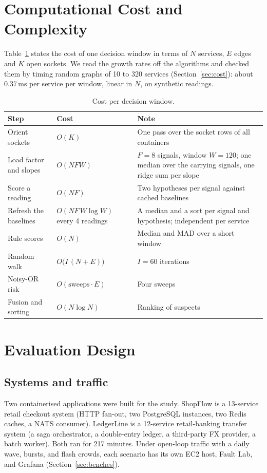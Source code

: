 \section{Computational Cost and Complexity}
\label{sec:complexity}
Table~\ref{tab:complexity} states the cost of one decision window in terms of $N$ services, $E$ edges and $K$ open sockets. We read the growth rates off the algorithms and checked them by timing random graphs of 10 to 320 services (Section~\ref{sec:cost}): about $0.37$\,ms per service per window, linear in $N$, on synthetic readings.

\begin{table}[!htbp]
\centering
\caption{Cost per decision window.}
\label{tab:complexity}
\small
\renewcommand{\arraystretch}{1.2}
\begin{tabularx}{\textwidth}{>{\raggedright\arraybackslash}p{4.2cm}>{\raggedright\arraybackslash}p{4.0cm}>{\raggedright\arraybackslash}X}
\toprule
\textbf{Step} & \textbf{Cost} & \textbf{Note}\\
\midrule
Orient sockets & $O(K)$ & One pass over the socket rows of all containers\\
Load factor and slopes & $O(N F W)$ & $F = 8$ signals, window $W = 120$; one median over the carrying signals, one ridge sum per slope\\
Score a reading & $O(N F)$ & Two hypotheses per signal against cached baselines\\
Refresh the baselines & $O(N F\, W \log W)$ every 4 readings & A median and a sort per signal and hypothesis; independent per service\\
Rule scores & $O(N)$ & Median and MAD over a short window\\
Random walk & $O\bigl(I\,(N+E)\bigr)$ & $I = 60$ iterations\\
Noisy-OR risk & $O(\text{sweeps}\cdot E)$ & Four sweeps\\
Fusion and sorting & $O(N \log N)$ & Ranking of suspects\\
\bottomrule
\end{tabularx}
\end{table}

\section{Evaluation Design}
\label{sec:evaldesign}

\subsection{Systems and traffic}
Two containerised applications were built for the study. ShopFlow is a 13-service retail checkout system (HTTP fan-out, two PostgreSQL instances, two Redis caches, a NATS consumer). LedgerLine is a 12-service retail-banking transfer system (a saga orchestrator, a double-entry ledger, a third-party FX provider, a batch worker). Both ran for 217 minutes. Under open-loop traffic with a daily wave, bursts, and flash crowds, each scenario has its own EC2 host, Fault Lab, and Grafana (Section~\ref{sec:benches}).

